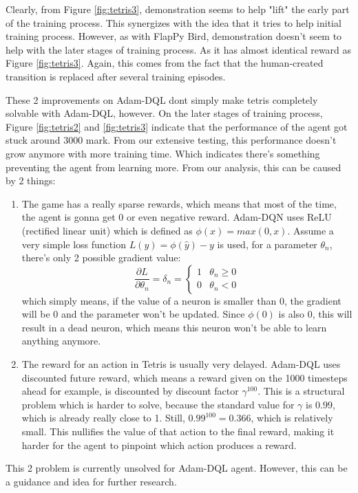     Clearly, from Figure \ref{fig:tetris3}, demonstration seems to help "lift" the early part of the training process. This synergizes with the idea that it tries to help initial training process. However, as with FlapPy Bird, demonstration doesn't seem to help with the later stages of training process. As it has almost identical reward as Figure \ref{fig:tetris3}. Again, this comes from the fact that the human-created transition is replaced after several training episodes.
    \par
    These 2 improvements on Adam-DQL dont simply make tetris completely solvable with Adam-DQL, however. On the later stages of training process, Figure \ref{fig:tetris2} and \ref{fig:tetris3} indicate that the performance of the agent got stuck around 3000 mark. From our extensive testing, this performance doesn't grow anymore with more training time. Which indicates there's something preventing the agent from learning more. From our analysis, this can be caused by 2 things:
    \begin{enumerate}
        \item The game has a really sparse rewards, which means that most of the time, the agent is gonna get 0 or even negative reward. Adam-DQN uses ReLU (rectified linear unit) which is defined as $\phi(x)= max(0,x)$. 
        Assume a very simple loss function $L(y)=\phi(\hat{y})-y$ is used, for a parameter $\theta_n$, there's only 2 possible gradient value:
        \begin{equation*}
            \frac{\partial L}{\partial \theta_n}=\delta_n=
            \begin{cases}
            1 & \theta_n \geq 0\\
            0 & \theta_n < 0
            \end{cases}
        \end{equation*}
        which simply means, if the value of a neuron is smaller than 0, the gradient will be 0 and the parameter won't be updated. Since  $\phi(0)$ is also 0, this will result in a dead neuron, which means this neuron won't be able to learn anything anymore.
        \item The reward for an action in Tetris is usually very delayed. Adam-DQL uses discounted future reward, which means a reward given on the 1000 timesteps ahead for example, is discounted by discount factor $\gamma^{100}$. This is a structural problem which is harder to solve, because the standard value for $\gamma$ is $0.99$, which is already really close to 1. Still, $0.99^{100}=0.366$, which is relatively small. This nullifies the value of that action to the final reward, making it harder for the agent to pinpoint which action produces a reward.
    \end{enumerate}
    
    This 2 problem is currently unsolved for Adam-DQL agent. However, this can be a guidance and idea for further research.
    
    